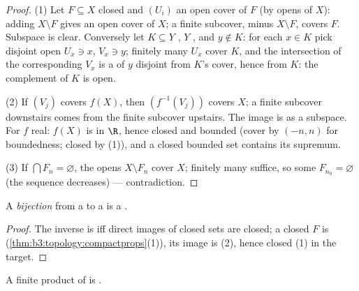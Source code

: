 \begin{proof}
(1) Let $F \subseteq X$ closed and $(U_i)$ an open cover of $F$
(by opens of $X$): adding $X \setminus F$ gives an open cover of
$X$; a finite subcover, minus $X \setminus F$, covers $F$.
Subspace  is clear. Conversely let $K \subseteq Y$
, $Y$ , and $y \notin K$: for each $x \in K$
pick disjoint open $U_x \ni x$, $V_x \ni y$; finitely many $U_x$
cover $K$, and the intersection of the corresponding $V_x$ is a
 of $y$ disjoint from $K$'s cover, hence from $K$:
the complement of $K$ is open.

(2) If $(V_j)$ covers $f(X)$, then $(f^{-1}(V_j))$ covers $X$; a
finite subcover downstairs comes from the finite subcover
upstairs. The image is  as a subspace. For $f$ real:
$f(X)$ is  in $\R$, hence closed and bounded (cover by
$(-n, n)$ for boundedness; closed by (1)), and a closed bounded
set contains its supremum.

(3) If $\bigcap F_n = \varnothing$, the opens $X \setminus F_n$
cover $X$; finitely many suffice, so some $F_{n_0} =
\varnothing$ (the sequence decreases) --- contradiction.
\end{proof}

\begin{corollary}\label{cor:b3:topology:compacthomeo}
A  \emph{bijection} from a  to a
 is a .
\end{corollary}

\begin{proof}
The inverse is  iff direct images of closed sets are
closed; a closed $F$ is 
(\cref{thm:b3:topology:compactprops}(1)), its image is 
(2), hence closed (1) in the  target.
\end{proof}

\begin{theorem}\label{thm:b3:topology:tychonoff}
A finite product of  is .
\end{theorem}

